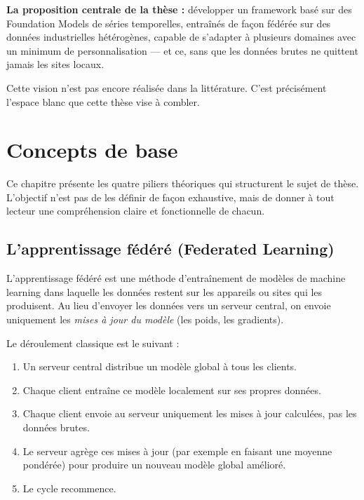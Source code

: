 \documentclass[12pt, a4paper]{report}
\begin{document}
\begin{infobox}
\textbf{La proposition centrale de la thèse :} développer un framework basé sur des
Foundation Models de séries temporelles, entraînés de façon fédérée sur des données
industrielles hétérogènes, capable de s'adapter à plusieurs domaines avec un minimum
de personnalisation --- et ce, sans que les données brutes ne quittent jamais les sites locaux.
\end{infobox}

Cette vision n'est pas encore réalisée dans la littérature. C'est précisément l'espace
blanc que cette thèse vise à combler.

\chapter{Concepts de base}

Ce chapitre présente les quatre piliers théoriques qui structurent le sujet de thèse.
L'objectif n'est pas de les définir de façon exhaustive, mais de donner à tout lecteur
une compréhension claire et fonctionnelle de chacun.

\section{L'apprentissage fédéré (Federated Learning)}

L'apprentissage fédéré est une méthode d'entraînement de modèles de machine learning
dans laquelle les données restent sur les appareils ou sites qui les produisent. Au lieu
d'envoyer les données vers un serveur central, on envoie uniquement les \textit{mises à
jour du modèle} (les poids, les gradients).

Le déroulement classique est le suivant :
\begin{enumerate}
  \item Un serveur central distribue un modèle global à tous les clients.
  \item Chaque client entraîne ce modèle localement sur ses propres données.
  \item Chaque client envoie au serveur uniquement les mises à jour calculées,
  pas les données brutes.
  \item Le serveur agrège ces mises à jour (par exemple en faisant une moyenne
  pondérée) pour produire un nouveau modèle global amélioré.
  \item Le cycle recommence.
\end{enumerate}
\end{document}
